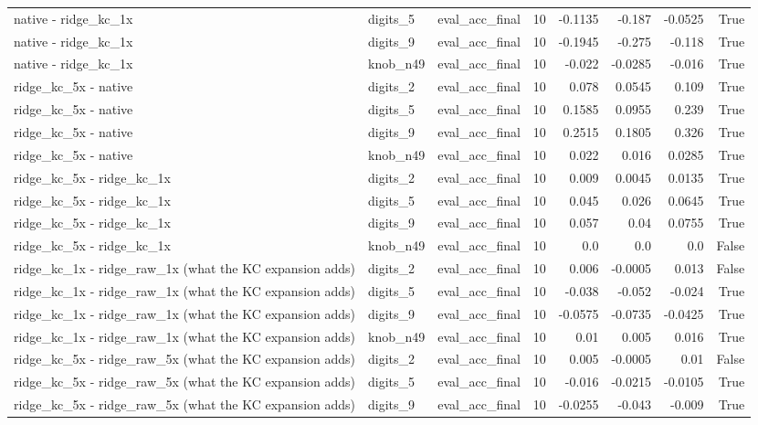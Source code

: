 \begin{table}[t]
\begin{tabular}{lllrrrrr}
native - ridge\_kc\_1x & digits\_5 & eval\_acc\_final & 10 & -0.1135 & -0.187 & -0.0525 & True \\
native - ridge\_kc\_1x & digits\_9 & eval\_acc\_final & 10 & -0.1945 & -0.275 & -0.118 & True \\
native - ridge\_kc\_1x & knob\_n49 & eval\_acc\_final & 10 & -0.022 & -0.0285 & -0.016 & True \\
ridge\_kc\_5x - native & digits\_2 & eval\_acc\_final & 10 & 0.078 & 0.0545 & 0.109 & True \\
ridge\_kc\_5x - native & digits\_5 & eval\_acc\_final & 10 & 0.1585 & 0.0955 & 0.239 & True \\
ridge\_kc\_5x - native & digits\_9 & eval\_acc\_final & 10 & 0.2515 & 0.1805 & 0.326 & True \\
ridge\_kc\_5x - native & knob\_n49 & eval\_acc\_final & 10 & 0.022 & 0.016 & 0.0285 & True \\
ridge\_kc\_5x - ridge\_kc\_1x & digits\_2 & eval\_acc\_final & 10 & 0.009 & 0.0045 & 0.0135 & True \\
ridge\_kc\_5x - ridge\_kc\_1x & digits\_5 & eval\_acc\_final & 10 & 0.045 & 0.026 & 0.0645 & True \\
ridge\_kc\_5x - ridge\_kc\_1x & digits\_9 & eval\_acc\_final & 10 & 0.057 & 0.04 & 0.0755 & True \\
ridge\_kc\_5x - ridge\_kc\_1x & knob\_n49 & eval\_acc\_final & 10 & 0.0 & 0.0 & 0.0 & False \\
ridge\_kc\_1x - ridge\_raw\_1x (what the KC expansion adds) & digits\_2 & eval\_acc\_final & 10 & 0.006 & -0.0005 & 0.013 & False \\
ridge\_kc\_1x - ridge\_raw\_1x (what the KC expansion adds) & digits\_5 & eval\_acc\_final & 10 & -0.038 & -0.052 & -0.024 & True \\
ridge\_kc\_1x - ridge\_raw\_1x (what the KC expansion adds) & digits\_9 & eval\_acc\_final & 10 & -0.0575 & -0.0735 & -0.0425 & True \\
ridge\_kc\_1x - ridge\_raw\_1x (what the KC expansion adds) & knob\_n49 & eval\_acc\_final & 10 & 0.01 & 0.005 & 0.016 & True \\
ridge\_kc\_5x - ridge\_raw\_5x (what the KC expansion adds) & digits\_2 & eval\_acc\_final & 10 & 0.005 & -0.0005 & 0.01 & False \\
ridge\_kc\_5x - ridge\_raw\_5x (what the KC expansion adds) & digits\_5 & eval\_acc\_final & 10 & -0.016 & -0.0215 & -0.0105 & True \\
ridge\_kc\_5x - ridge\_raw\_5x (what the KC expansion adds) & digits\_9 & eval\_acc\_final & 10 & -0.0255 & -0.043 & -0.009 & True \\

\end{tabular}
\end{table}
